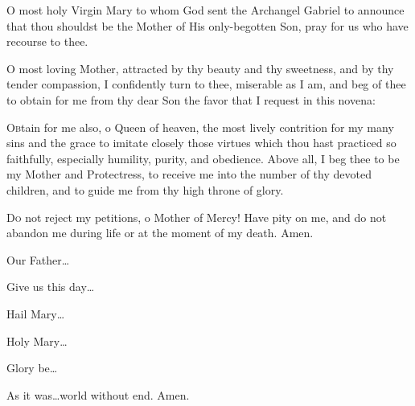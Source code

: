 {\centering\Large{\MakeUppercase{}}\par}

\begin{enpars}

\lettrine{O}{} most holy Virgin Mary to whom God sent the Archangel Gabriel to announce that thou shouldst be the Mother of His only-begotten Son,
pray for us who have recourse to thee.

\lettrine{O}{} most loving Mother, attracted by thy beauty and thy sweetness, and by thy tender compassion, I confidently turn to thee, miserable as I am, and beg of thee to obtain for me from thy dear Son the favor that I request in this novena: 


\lettrine{O}{b}tain for me also, o Queen of heaven, the most lively contrition for my many sins and the grace to imitate closely those virtues which thou hast practiced so faithfully, especially humility, purity, and obedience. Above all, I beg thee to be my Mother and Protectress, to receive me into the number of thy devoted children, and to guide me from thy high throne of glory.

\lettrine{D}{o} not reject my petitions, o Mother of Mercy! Have pity on me, and do not abandon me during life or at the moment of my death. Amen.

\vv Our Father…

\rr Give us this day…

\vv Hail Mary…

\rr Holy Mary…

\vv Glory be…

\rr As it was…world without end. Amen.
\end{enpars}


%
%
%
%
